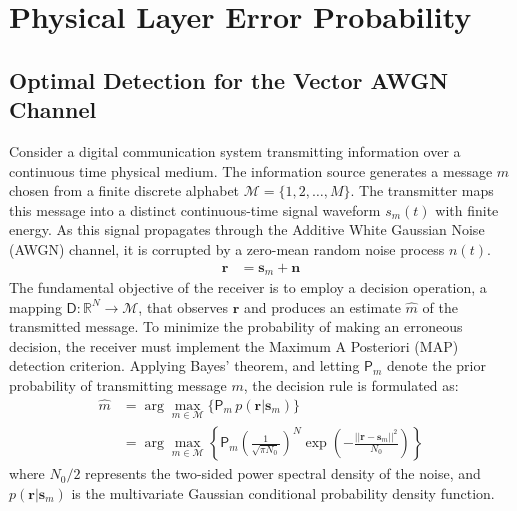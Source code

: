 \chapter{Physical Layer Error Probability} \label{appendix:physical_layer}

\section{Optimal Detection for the Vector AWGN Channel}

Consider a digital communication system transmitting information over a continuous time physical medium. The information source generates a message $m$ chosen from a finite discrete alphabet $\mathcal{M} = \{1, 2, \dots, M\}$. The transmitter maps this message into a distinct continuous-time signal waveform $s_m(t)$ with finite energy. As this signal propagates through the Additive White Gaussian Noise (AWGN) channel, it is corrupted by a zero-mean random noise process $n(t)$.
\begin{align*}
    \bm{r} &= \bm{s}_m + \bm{n}
\end{align*}
The fundamental objective of the receiver is to employ a decision operation, a mapping $\mathsf{D}: \mathbb{R}^N \to \mathcal{M}$, that observes $\bm{r}$ and produces an estimate $\hat{m}$ of the transmitted message. To minimize the probability of making an erroneous decision, the receiver must implement the Maximum A Posteriori (MAP) detection criterion. Applying Bayes' theorem, and letting $\mathsf{P}_m$ denote the prior probability of transmitting message $m$, the decision rule is formulated as:
\begin{align*}
    \hat{m} &= \arg\max_{m \in \mathcal{M}} \{ \mathsf{P}_m \, p(\bm{r}|\bm{s}_m) \} \\
            &= \arg\max_{m \in \mathcal{M}} \left\{ \mathsf{P}_m \left(\frac{1}{\sqrt{\pi N_0}}\right)^N \exp\left(-\frac{||\bm{r} - \bm{s}_m||^2}{N_0}\right) \right\}
\end{align*}
where $N_0/2$ represents the two-sided power spectral density of the noise, and $p(\bm{r}|\bm{s}_m)$ is the multivariate Gaussian conditional probability density function.

